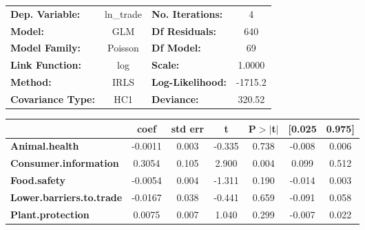 \begin{center}
\begin{tabular}{lclc}
\toprule
\textbf{Dep. Variable:}                                            &   ln\_trade   & \textbf{  No. Iterations:    } &     4       \\
\textbf{Model:}                                                    &      GLM      & \textbf{  Df Residuals:      } &    640      \\
\textbf{Model Family:}                                             &    Poisson    & \textbf{  Df Model:          } &     69      \\
\textbf{Link Function:}                                            &      log      & \textbf{  Scale:             } &    1.0000   \\
\textbf{Method:}                                                   &      IRLS     & \textbf{  Log-Likelihood:    } &   -1715.2   \\
\textbf{Covariance Type:}                                          &      HC1      & \textbf{  Deviance:          } &    320.52   \\
\bottomrule
\end{tabular}
\begin{tabular}{lcccccc}
                                                                   & \textbf{coef} & \textbf{std err} & \textbf{t} & \textbf{P$> |$t$|$} & \textbf{[0.025} & \textbf{0.975]}  \\
\midrule
\textbf{Animal.health}                                             &      -0.0011  &        0.003     &    -0.335  &         0.738        &       -0.008    &        0.006     \\
\textbf{Consumer.information}                                      &       0.3054  &        0.105     &     2.900  &         0.004        &        0.099    &        0.512     \\
\textbf{Food.safety}                                               &      -0.0054  &        0.004     &    -1.311  &         0.190        &       -0.014    &        0.003     \\
\textbf{Lower.barriers.to.trade}                                   &      -0.0167  &        0.038     &    -0.441  &         0.659        &       -0.091    &        0.058     \\
\textbf{Plant.protection}                                          &       0.0075  &        0.007     &     1.040  &         0.299        &       -0.007    &        0.022     \\

\end{tabular}
\end{center}
